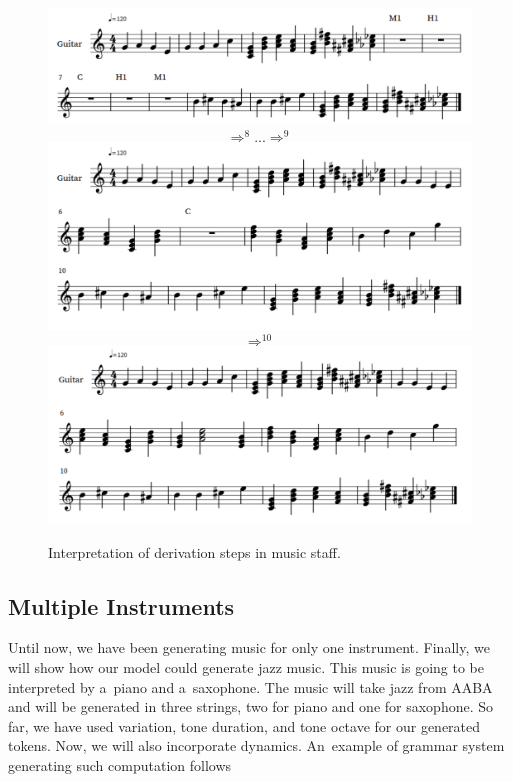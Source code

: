 \begin{figure}[H]
\centering
\includegraphics[scale=0.35]{obrazky-figures/Ste1.pdf}
\[
\Rightarrow^8 ... \Rightarrow^9
\]
\includegraphics[scale=0.35]{obrazky-figures/Ste2.pdf}
\[
\Rightarrow^{10}
\]
\includegraphics[scale=0.35]{obrazky-figures/Ste3.pdf}
\caption{Interpretation of derivation steps in music staff.}
\label{fig:def1final2}
\end{figure}

\subsection*{Multiple Instruments}
Until now, we have been generating music for only one instrument. Finally, we will show how our model could generate jazz music. This music is going to be interpreted by a~piano and a~saxophone. The music will take jazz from AABA and will be generated in three strings, two for piano and one for saxophone. So far, we have used variation, tone duration, and tone octave for our generated tokens. Now, we will also incorporate dynamics. An~example of grammar system generating such computation follows

